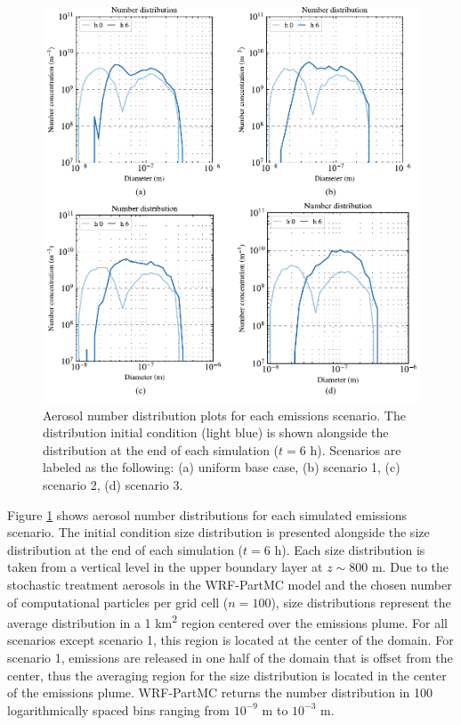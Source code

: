 \begin{figure}[!t]
  \centering
    \includegraphics[width=\textwidth]{figures/chapter5/number-distribution-plots.pdf}
    \caption{Aerosol number distribution plots for each emissions scenario. The distribution initial condition (light blue) is shown alongside the distribution at the end of each simulation ($t=6$ h). Scenarios are labeled as the following: (a) uniform base case, (b) scenario 1, (c) scenario 2, (d) scenario 3.}
    \label{fig:number-dists}
\end{figure}

Figure \ref{fig:number-dists} shows aerosol number distributions for each simulated emissions scenario. The initial condition size distribution is presented alongside the size distribution at the end of each simulation ($t=6$ h). Each size distribution is taken from a vertical level in the upper boundary layer at $z\sim800$ \si{m}. Due to the stochastic treatment aerosols in the WRF-PartMC model and the chosen number of computational particles per grid cell ($n=100$), size distributions represent the average distribution in a 1 \si{km^2} region centered over the emissions plume. For all scenarios except scenario 1, this region is located at the center of the domain. For scenario 1, emissions are released in one half of the domain that is offset from the center, thus the averaging region for the size distribution is located in the center of the emissions plume. WRF-PartMC returns the number distribution in 100 logarithmically spaced bins ranging from $10^{-9}$ m to $10^{-3}$ m.

